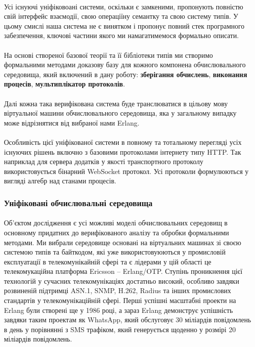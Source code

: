 \documentclass[11pt,oneside]{article}
\begin{document}
   \paragraph{}
   Усі існуючі уніфіковоані системи, оскільки є замкеними, пропонують
   повністю свій інтерфейс взаємодії, свою операціїну семантку та свою систему типів.
   У цьому смислі наша система не є винятком і пропонує повний стек
   програмного забезпечення, ключові частини якого ми намагатимемося формально
   описати.

   \paragraph{}
   На основі створеної базової теорії та її бібліотеки типів ми створимо
   формальними методами доказову базу для кожного компонена обчислювального
   середовища, який включений в дану роботу: {\bf зберігання обчислень},
   {\bf виконання процесів}, {\bf мультиплікатор протоколів}.

   \paragraph{}
   Далі кожна така верифікована система буде транслюватися в цільову мову
   віртуальної машини обчислювального середовища, яка у загальному випадку
   може відрізнятися від вибраної нами Erlang.

   \paragraph{}
   Особливість цієї уніфікованої системи в повному та тотальному перегляді
   усіх існуючих рішень включно з базовими протоколами інтернету типу HTTP.
   Так наприклад для сервера додатків у якості транспортного протоколу
   використовується бінарний WebSocket протокол. Усі протоколи формулюються
   у вигляді алгебр над станами процесів.

\subsubsection{Уніфіковані обчислювальні середовища}

   \paragraph{}
   Об’єктом дослідження є усі можливі моделі обчислювальних середовищ в основному придатних
   до верифікованого аналізу та обробки формальними методами. Ми вибрали середовище
   основані на віртуальних машинах зі своєю системою типів та байткодом, які уже
   використовуюються у промисловій експлуатації в телекомунікайній сфері та є лідерами
   у цій області це телекомукаційна платформа Ericsson -- Erlang/OTP. Ступінь проникнення
   цієї технологій у сучасних телекомунікаціях достатньо високий, особливо завдяки
   розвиненій підтримці ASN.1, SNMP, H.262, Radius та інших промислових стандартів
   у телекомунікаційній сфері. Перші успішні масштабні проекти на Erlang були створені ще у
   1986 році, а зараз Erlang демонструє успішність завдяки таким проектам як WhatsApp, який
   обслуговує 30 міліардів повідомлень в день у порівнянні з SMS трафіком,
   який генерується щоденно у розмірі 20 міліардів повідомлень.
\end{document}

